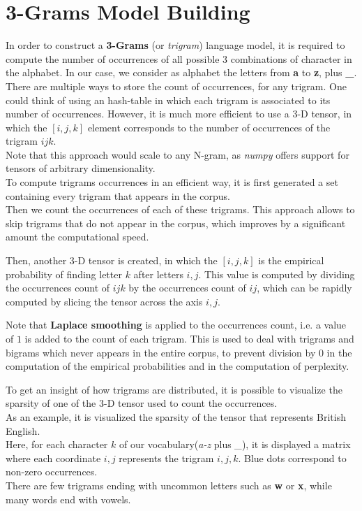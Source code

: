 \documentclass[
12pt,
a4paper,
oneside,
headinclude,
footinclude]{article}
\theoremstyle{definition} %
\begin{document}
\section{3-Grams Model Building}
In order to construct a \textbf{3-Grams} (or \textit{trigram}) language model, it is required to compute the number of occurrences of all possible 3 combinations of character in the alphabet. In our case, we consider as alphabet the letters from \textbf{a} to \textbf{z}, plus \textbf{\_}.\\
There are multiple ways to store the count of occurrences, for any trigram. One could think of using an hash-table in which each trigram is associated to its number of occurrences. However, it is much more efficient to use a 3-D tensor, in which the $[i, j, k]$ element corresponds to the number of occurrences of the trigram $ijk$.\\
Note that this approach would scale to any N-gram, as \textit{numpy} offers support for tensors of arbitrary dimensionality.\\
To compute trigrams occurrences in an efficient way, it is first generated a set containing every trigram that appears in the corpus.\\
Then we count the occurrences of each of these trigrams. This approach allows to skip trigrams that do not appear in the corpus, which improves by a significant amount the computational speed.

Then, another 3-D tensor is created, in which the $[i, j, k]$ is the empirical probability of finding letter $k$ after letters $i, j$.
This value is computed by dividing the occurrences count of $ijk$ by the occurrences count of $ij$, which can be rapidly computed by slicing the tensor across the axis $i, j$.

Note that \textbf{Laplace smoothing} is applied to the occurrences count, i.e. a value of $1$ is added to the count of each trigram.
This is used to deal with trigrams and bigrams which never appears in the entire corpus, to prevent division by $0$ in the computation of the empirical probabilities and in the computation of perplexity.

To get an insight of how trigrams are distributed, it is possible to visualize the sparsity of one of the 3-D tensor used to count the occurrences.\\
As an example, it is visualized the sparsity of the tensor that represents British English.\\
Here, for each character $k$ of our vocabulary(\textit{a-z} plus \textit{\_}), it is displayed a matrix where each coordinate $i, j$ represents the trigram $i, j, k$. Blue dots correspond to non-zero occurrences.\\
There are few trigrams ending with uncommon letters such as \textbf{w} or \textbf{x}, while many words end with vowels.
\end{document}
